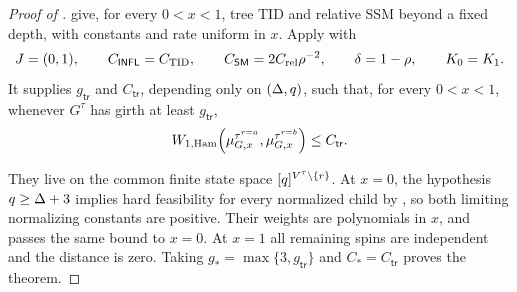 \begin{proof}[Proof of ]
 give, for every \(0<x<1\),
tree TID and relative SSM beyond a fixed depth, with constants and rate
uniform in \(x\).  Apply  with
\[
 J=(0,1),\qquad
 C_{\mathsf{INFL}}=C_{\rm TID},\qquad
 C_{\mathsf{SM}}=2C_{\rm rel}\rho^{-2},\qquad
 \delta=1-\rho,\qquad K_0=K_1.
\]
It supplies \(g_{\mathsf{tr}}\) and \(C_{\mathsf{tr}}\), depending only on
\((\Deg,q)\), such that, for every \(0<x<1\), whenever $G^\tau$ has girth at
least $g_{\mathsf{tr}}$,
\begin{equation}
  \WHam\!\left(
    \mupin{G}{\tau^{r=a}}{x},
    \mupin{G}{\tau^{r=b}}{x}
  \right)\le C_{\mathsf{tr}}.
  \label{eq:hg-potts-transfer-W1}
\end{equation}

They live on the common finite state space
$\colours^{V^\tau\setminus\{r\}}$.  At \(x=0\), the hypothesis
\(q\ge\Deg+3\) implies hard feasibility for every normalized child by
, so both limiting normalizing constants are positive.
Their weights are polynomials in \(x\), and
 passes the same bound to \(x=0\).  At
\(x=1\) all remaining spins are independent and the distance is zero.
Taking \(g_*=\max\{3,g_{\mathsf{tr}}\}\) and
\(C_*=C_{\mathsf{tr}}\) proves the theorem.
\end{proof}
